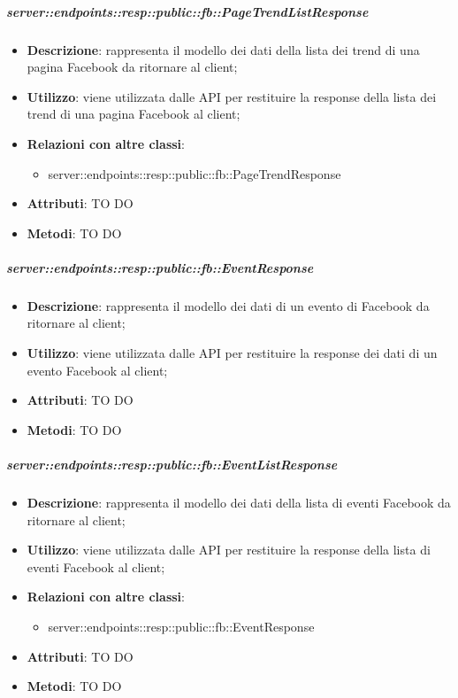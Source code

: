     \subparagraph{server::endpoints::resp::public::fb::PageTrendListResponse} %
    \label{subp:bdsm_app_server_endpoints_resp_public_fb_pagetrendlistresponse}
    \begin{itemize}
      \item \textbf{Descrizione}: rappresenta il modello dei dati della lista dei trend di una pagina Facebook da ritornare al client;
      \item \textbf{Utilizzo}: viene utilizzata dalle API per restituire la response della lista dei trend di una pagina Facebook al client;
      \item \textbf{Relazioni con altre classi}:
        \begin{itemize}
          \item server::endpoints::resp::public::fb::PageTrendResponse
        \end{itemize}
	  \item \textbf{Attributi}: TO DO
	  \item \textbf{Metodi}: TO DO
      \end{itemize}

    \subparagraph{server::endpoints::resp::public::fb::EventResponse} %
    \label{subp:bdsm_app_server_endpoints_resp_public_fb_eventresponse}
    \begin{itemize}
      \item \textbf{Descrizione}: rappresenta il modello dei dati di un evento di Facebook da ritornare al client;
      \item \textbf{Utilizzo}: viene utilizzata dalle API per restituire la response dei dati di un evento Facebook al client;
      
	  \item \textbf{Attributi}: TO DO
	  \item \textbf{Metodi}: TO DO
      \end{itemize}

    \subparagraph{server::endpoints::resp::public::fb::EventListResponse} %
    \label{subp:bdsm_app_server_endpoints_resp_public_fb_eventlistresponse}
    \begin{itemize}
      \item \textbf{Descrizione}: rappresenta il modello dei dati della lista di eventi Facebook da ritornare al client;
      \item \textbf{Utilizzo}: viene utilizzata dalle API per restituire la response della lista di eventi Facebook al client;
      \item \textbf{Relazioni con altre classi}:
        \begin{itemize}
          \item server::endpoints::resp::public::fb::EventResponse
        \end{itemize}
	  \item \textbf{Attributi}: TO DO
	  \item \textbf{Metodi}: TO DO
      \end{itemize}


